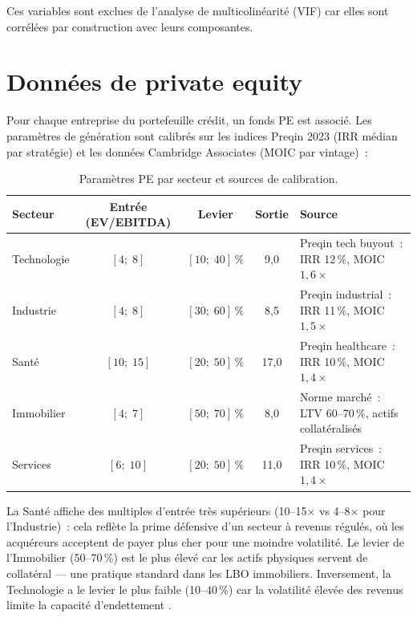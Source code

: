 \documentclass[12pt, a4paper, twoside, openright]{report}
\theoremstyle{definition}
\begin{document}
Ces variables sont exclues de l'analyse de multicolinéarité (VIF) car elles sont corrélées par construction avec leurs composantes.


\section{Données de private equity}
\label{sec:donnees:pe}

Pour chaque entreprise du portefeuille crédit, un fonds PE est associé.
Les paramètres de génération sont calibrés sur les indices Preqin 2023 (IRR médian par stratégie) et les données Cambridge Associates (MOIC par vintage)~:

\begin{table}[htbp]
\centering
\caption{Paramètres PE par secteur et sources de calibration.}
\label{tab:pe_params}
\begin{tabular}{lcccl}
\toprule
Secteur & Entrée (EV/EBITDA) & Levier & Sortie & Source \\
\midrule
Technologie & $[4;\; 8]$ & $[10;\; 40]\,\%$ & 9{,}0 & Preqin tech buyout~: IRR 12\,\%, MOIC $1{,}6\times$ \\
Industrie   & $[4;\; 8]$ & $[30;\; 60]\,\%$ & 8{,}5 & Preqin industrial~: IRR 11\,\%, MOIC $1{,}5\times$ \\
Santé       & $[10;\; 15]$ & $[20;\; 50]\,\%$ & 17{,}0 & Preqin healthcare~: IRR 10\,\%, MOIC $1{,}4\times$ \\
Immobilier  & $[4;\; 7]$ & $[50;\; 70]\,\%$ & 8{,}0 & Norme marché~: LTV 60--70\,\%, actifs collatéralisés \\
Services    & $[6;\; 10]$ & $[20;\; 50]\,\%$ & 11{,}0 & Preqin services~: IRR 10\,\%, MOIC $1{,}4\times$ \\
\bottomrule
\end{tabular}
\end{table}

La Santé affiche des multiples d'entrée très supérieurs (10--15$\times$ vs 4--8$\times$ pour l'Industrie)~: cela reflète la prime défensive d'un secteur à revenus régulés, où les acquéreurs acceptent de payer plus cher pour une moindre volatilité.
Le levier de l'Immobilier (50--70\,\%) est le plus élevé car les actifs physiques servent de collatéral --- une pratique standard dans les LBO immobiliers.
Inversement, la Technologie a le levier le plus faible (10--40\,\%) car la volatilité élevée des revenus limite la capacité d'endettement \citep{ipev2022}.
\end{document}
